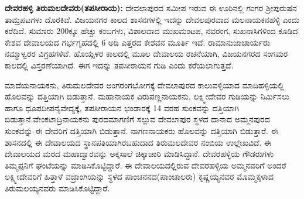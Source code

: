 \textbf{ದೇವರಹಳ್ಳಿ ತಿರುಮಲದೇವರು(ತಪಸೀರಾಯ):} ದೇವಲಾಪುರದ ಸಮೀಪ ಇರುವ ಈ ಊರಿನಲ್ಲಿ ಗಂಗರ ಶ‍್ರೀಪುರುಷನ ತಾಮ್ರಪಟಗಳು ದೊರಕಿವೆ. ವಿಜಯನಗರ ಕಾಲದ ಶಾಸನಗಳಲ್ಲಿ ಇದನ್ನು ದೇವಲಪುರವಾದ ಮಲನಾಯಕನಹಳ್ಳಿ ಎಂದು ಕರೆದಿದೆ. ಸುಮಾರು 200ಕ್ಕೂ ಹೆಚ್ಚು ಕಂಬಗಳು, ವಿಶಾಲವಾದ ಮುಖಮಂಟಪ, ನವರಂಗ, ಸುಖನಾಸಿಗಳಿಂದ ಕೂಡಿದ ಕೇಶವ ದೇವಾಲಯದ ಗರ್ಭಗೃಹದಲ್ಲಿ 6 ಅಡಿ ಎತ್ತರದ ಕೇಶವನ ಮೂರ್ತಿ ಇದೆ. ರಾಮಾನುಜಾಚಾರ್ಯರು ನಮ್ಮಾಳ್ವರರ ವಿಗ್ರಹಗಳಿವೆ. ಹೊಯ್ಸಳರ ಕಾಲದಲ್ಲಿ ಮೂಲ ದೇವಾಲಯ ರಚನೆಯಾಗಿ, ವಿಜಯನಗರದ ಸಂಗಮರ ಕಾಲದಲ್ಲಿ ವಿಸ್ತರಣೆಯಾಗಿದೆ. ಈಗ ಇದನ್ನು ತಪಸೀರಾಯನ ಗುಡಿ ಎಂದು ಕರೆಯಲಾಗುತ್ತದೆ.

ಮಾದೆಯನಾಯಕನು, ತಿರುಮಲದೇವರ ಅಂಗರಂಗಭೋಗಕ್ಕೆ ದೇವಲಾಪುರದ ಕಾಲುವಳ್ಳಿಯಾದ ಮಾದಿಹಳ್ಳಿಯಲ್ಲಿ ಹೊಲವನ್ನು ದತ್ತಿಯಾಗಿ ಬಿಡುತ್ತಾನೆ. ಮಹಾನಾಯಕ ವಿರುಪಣ್ಣನಾಯಕನು, ಲಕ್ಷ್ಮೀದೇವರ ಗುಡಿಯನ್ನು ನಿರ್ಮಿಸಲು ಹಾಗೂ ಧೂಪದೀಪನೈವೇದ್ಯಕ್ಕೆ, ತಪಸೀರಾಯನ ಭಂಡಾರಕ್ಕೆ 14 ವರಹ ಸುಂಕವನ್ನು ದತ್ತಿಯಾಗಿ ಬಿಡುತ್ತಾನೆ.\break ವೇಂಕಟಾದ್ರಿನಾಯಕನು ಪುರದಮಾಗಣಿಗೆ ಸಲ್ಲುವ ದೇವಲಾಪುರ ಸ್ಥಳದ ದಾನಾದ ಅಮ್ಮನಪುರದ ಸುಂಕವನ್ನು ಈ ದೇವರಿಗೆ ದತ್ತಿಯಾಗಿ ಬಿಡುತ್ತಾನೆ. ನಾಗಣನಾಯಕರು ಹೊಲವನ್ನು ದತ್ತಿಯಾಗಿ ಬಿಡುತ್ತಾರೆ. ಈ ಶಾಸನದಲ್ಲಿ ಈ ದೇವಾಲಯದ ಸ್ಥಾನಪತಿಯಾಗಿರಬಹುದಾದ ತಿರುಮಲದೇವರ ನಂಬಿಯ ಉಲ್ಲೇಖವಿದೆ. ಈ ದೇವಾಲಯದ ಮರದ ಮಹಾದ್ವಾರವನ್ನು ಅಕ್ಕಸಾಲೆ ಚಿಕ್ಕಾಚಾರಿ ಮಾಡಿಸಿದ್ದಾನೆ. ದೇವರಹಳ್ಳಿಯ ಗೌಡರುಗಳು ತಿಮ್ಮಪ್ಪನಿಗೆ ಘಂಟೆಯನ್ನು ಮಾಡಿಸಿಕೊಟ್ಟಿದ್ದಾರೆ. ಈ ದೇವಾಲಯದಲ್ಲಿರುವ ದೇವರಹಳ್ಳಿಯ ಅಮ್ಮನವರಿಗೆ ಅಂದರೆ ಲಕ್ಷ್ಮೀದೇವರಿಗೆ ಹಿತ್ತಾಳೆ ವಜ್ರಾಂಗಿಯನ್ನು ಸ್ಥಳದ ಪಾಂಚನನದ(ಪಾಂಚಾಲರು) ಕೃಷ್ಣಯ್ಯನವರ ಮೊಮ್ಮಕ್ಕಳಾದ ತಿರುಮಲಯ್ಯನವರು ಮಾಡಿಸಿಕೊಟ್ಟಿದ್ದಾರೆ.


